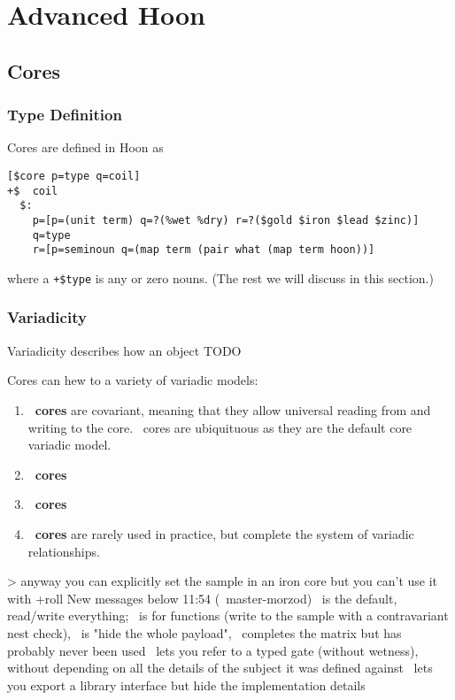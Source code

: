 \setchapterpreamble[u]{\margintoc}
\chapter{Advanced Hoon}


\section{Cores}

\subsection{Type Definition}

Cores are defined in Hoon as

\begin{lstlisting}
[$core p=type q=coil]
+$  coil
  $:
    p=[p=(unit term) q=?(%wet %dry) r=?($gold $iron $lead $zinc)]
    q=type
    r=[p=seminoun q=(map term (pair what (map term hoon))]
\end{lstlisting}

where a \texttt{+\$type} is any or zero nouns.  (The rest we will discuss in this section.)

\subsection{Variadicity}

Variadicity describes how an object TODO

Cores can hew to a variety of variadic models:

\begin{enumerate}
  \item  \textbf{\gold~cores} are covariant, meaning that they allow universal reading from and writing to the core.  \gold~cores are ubiquituous as they are the default core variadic model.
  \item  \textbf{\iron~cores}
  \item  \textbf{\lead~cores}
  \item  \textbf{\zinc~cores} are rarely used in practice, but complete the system of variadic relationships.
\end{enumerate}

> anyway you can explicitly set the sample in an iron core
but you can't use it with +roll
New messages below
11:54 (~master-morzod)
\gold~is the default, read/write everything; \iron~is for functions (write to the sample with a contravariant nest check), \lead~is "hide the whole payload", \zinc~completes the matrix
but has probably never been used
\iron~lets you refer to a typed gate (without wetness), without depending on all the details of the subject it was defined against
\lead~lets you export a library interface but hide the implementation details

